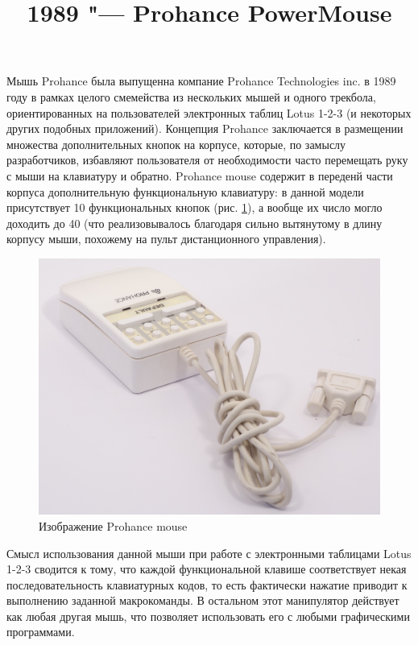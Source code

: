 \documentclass[11pt, a4paper]{article}
\begin{document}
\title{1989 "--- Prohance PowerMouse}
\date{}
\maketitle

Мышь Prohance была выпущенна компание Prohance Technologies inc. в 1989 году в рамках целого смемейства из нескольких мышей и одного трекбола, ориентированных на пользователей электронных таблиц Lotus 1-2-3 (и некоторых других подобных приложений). Концепция Prohance заключается в размещении множества дополнительных кнопок на корпусе, которые, по замыслу разработчиков, избавляют пользователя от необходимости часто перемещать руку с мыши на клавиатуру и обратно. Prohance mouse содержит в переденй части корпуса дополнительную функциональную клавиатуру: в данной модели присутствует 10 функциональных кнопок (рис. \ref{fig:ProhancePhoto}), а вообще их число могло доходить до 40 (что реализовывалось благодаря сильно вытянутому в длину корпусу мыши, похожему на пульт дистанционного управления).

\begin{figure}[h]
    \centering
    \includegraphics[scale=0.4]{1989_prohance_powermouse/5.1jpg.jpg}
    \caption{Изображение Prohance mouse}
    \label{fig:ProhancePhoto}
\end{figure}

Смысл использования данной мыши при работе с электронными таблицами Lotus 1-2-3 сводится к тому, что каждой функциональной клавише соответствует некая последовательность клавиатурных кодов, то есть фактически нажатие приводит к выполнению заданной макрокоманды. В остальном этот манипулятор действует как любая другая мышь, что позволяет использовать его с любыми графическими программами.
\end{document}
